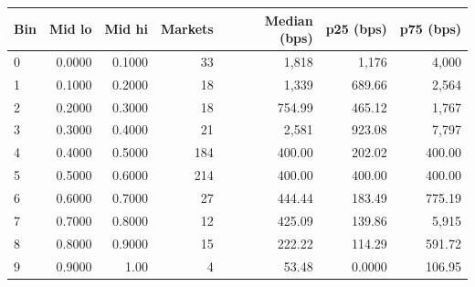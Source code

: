 \begin{tabular}{lrrrrrr}
\toprule
Bin & Mid lo & Mid hi & Markets & Median (bps) & p25 (bps) & p75 (bps) \\
\midrule
0 & 0.0000 & 0.1000 & 33 & 1,818 & 1,176 & 4,000 \\
1 & 0.1000 & 0.2000 & 18 & 1,339 & 689.66 & 2,564 \\
2 & 0.2000 & 0.3000 & 18 & 754.99 & 465.12 & 1,767 \\
3 & 0.3000 & 0.4000 & 21 & 2,581 & 923.08 & 7,797 \\
4 & 0.4000 & 0.5000 & 184 & 400.00 & 202.02 & 400.00 \\
5 & 0.5000 & 0.6000 & 214 & 400.00 & 400.00 & 400.00 \\
6 & 0.6000 & 0.7000 & 27 & 444.44 & 183.49 & 775.19 \\
7 & 0.7000 & 0.8000 & 12 & 425.09 & 139.86 & 5,915 \\
8 & 0.8000 & 0.9000 & 15 & 222.22 & 114.29 & 591.72 \\
9 & 0.9000 & 1.00 & 4 & 53.48 & 0.0000 & 106.95 \\
\bottomrule
\end{tabular}
